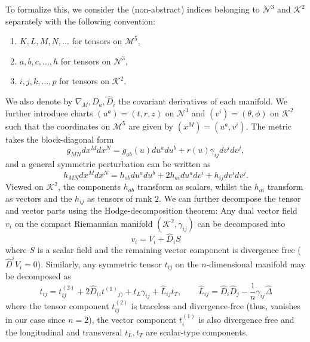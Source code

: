 \documentclass[11pt,aip,jmp,amsmath,amssymb,draft]{revtex4-1}
\begin{document}
To formalize this, we consider the (non-abstract) indices belonging to $\mathcal N^3$ and $\mathcal K^2$ separately with the following convention:
\begin{enumerate}
    \item $K,L,M,N,\dots$ for tensors on $\mathcal M^5$,
    \item $a,b,c,\dots,h$ for tensors on $\mathcal N^3$,
    \item $i,j,k,\dots,p$ for tensors on $\mathcal K^2$.
\end{enumerate}
We also denote by $\nabla_M, D_a, \hat D_i$ the covariant derivatives of each manifold. We further introduce charts $(u^a) = (t, r, z)$ on $\mathcal N^3$ and $(v^i) = (\theta, \phi)$ on $\mathcal K^2$ such that the coordinates on $\mathcal M^5$ are given by $(x^M) =(u^a,v^i)$.
The metric takes the block-diagonal form
\begin{equation}
    g_{MN} dx^Mdx^N = g_{ab}(u)du^adu^b + r(u) \gamma_{ij}dv^idv^j,
\end{equation}
and a general symmetric perturbation can be written as
\begin{equation}
    h_{MN} dx^Mdx^N = h_{ab}du^adu^b + 2h_{ai} du^adv^i + h_{ij}dv^idv^j.
\end{equation}
Viewed on $\mathcal K^2$, the components $h_{ab}$ transform as scalars, whilst the $h_{ai}$ transform as vectors and the $h_{ij}$ as tensors of rank $2$. 
We can further decompose the tensor and vector parts using the Hodge-decomposition theorem: Any dual vector field $v_i$ on the compact Riemannian manifold $(\mathcal K^2, \gamma_{ij})$ can be decomposed into 
\begin{equation}
    v_i = V_i + \hat D_i S  \label{eq:vector_hodge}  
\end{equation}
where $S$ is a scalar field and the remaining vector component is divergence free ($\hat D^iV_i=0$).
Similarly, any symmetric tensor $t_{ij}$ on the $n$-dimensional manifold may be decomposed as
\begin{equation} \label{eq:tensor_hodge}
    t_{ij} = t_{ij}^{(2)} + 2\hat D_{(i}{t^{(1)}}_{j)} + t_L\gamma_{ij} + \hat L_{ij}t_T,
    \qquad \hat L_{ij} = \hat D_i\hat D_j - \frac{1}{n}\gamma_{ij}\hat \Delta
\end{equation}
where the tensor component $t^{(2)}_{ij}$ is traceless and divergence-free (thus, vanishes in our case since $n = 2$), the vector component $t^{(1)}_i$ is also divergence free and the longitudinal and transversal $t_L, t_T$ are scalar-type components.
\end{document}
